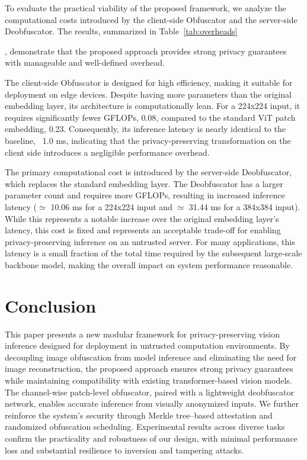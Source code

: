\documentclass{ieeeaccess}
\begin{document}
{To evaluate the practical viability of the proposed framework, we analyze the computational costs introduced by the client-side Obfuscator and the server-side Deobfuscator. The results, summarized in Table}~\ref{tab:overheads}{, demonstrate that the proposed approach provides strong privacy guarantees with manageable and well-defined overhead.

The client-side Obfuscator is designed for high efficiency, making it suitable for deployment on edge devices. Despite having more parameters than the original embedding layer, its architecture is computationally lean. For a 224x224 input, it requires significantly fewer GFLOPs, 0.08, compared to the standard ViT patch embedding, 0.23. Consequently, its inference latency is nearly identical to the baseline, ~1.0 ms, indicating that the privacy-preserving transformation on the client side introduces a negligible performance overhead.

The primary computational cost is introduced by the server-side Deobfuscator, which replaces the standard embedding layer. The Deobfuscator has a larger parameter count and requires more GFLOPs, resulting in increased inference latency ($\simeq$ 10.06 ms for a 224x224 input and $\simeq$ 31.44 ms for a 384x384 input). While this represents a notable increase over the original embedding layer's latency, this cost is fixed and represents an acceptable trade-off for enabling privacy-preserving inference on an untrusted server. For many applications, this latency is a small fraction of the total time required by the subsequent large-scale backbone model, making the overall impact on system performance reasonable.}

\section{Conclusion} \label{sec:con}

This paper presents a new modular framework for privacy-preserving vision inference designed for deployment in untrusted computation environments. By decoupling image obfuscation from model inference and eliminating the need for image reconstruction, the proposed approach ensures strong privacy guarantees while maintaining compatibility with existing transformer-based vision models. The channel-wise patch-level obfuscator, paired with a lightweight deobfuscator network, enables accurate inference from visually anonymized inputs. We further reinforce the system’s security through Merkle tree–based attestation and randomized obfuscation scheduling. Experimental results across diverse tasks confirm the practicality and robustness of our design, with minimal performance loss and substantial resilience to inversion and tampering attacks.
\end{document}
